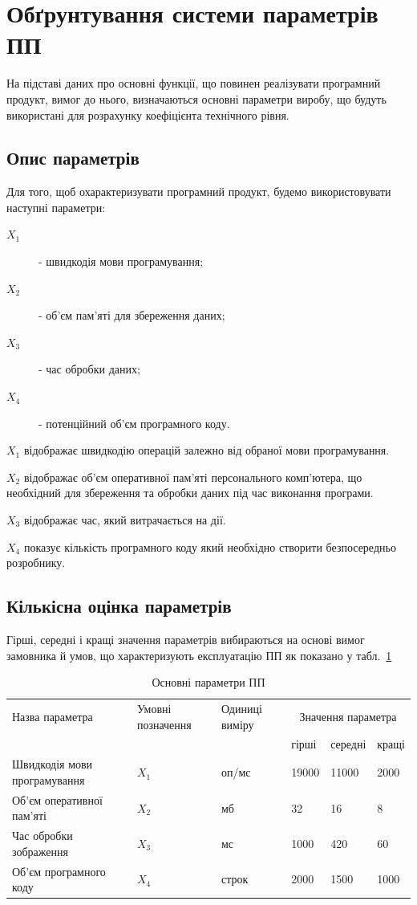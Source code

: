 \section{Обґрунтування системи параметрів ПП}
На підставі даних про основні функції, що повинен реалізувати програмний продукт, вимог до нього, визначаються основні параметри виробу, що будуть використані для розрахунку коефіцієнта технічного рівня.

\subsection{Опис параметрів}

Для того, щоб охарактеризувати програмний продукт, будемо використовувати наступні параметри:
\begin{description}
	\item[$X_1$] - швидкодія мови програмування;
	\item[$X_2$] - об’єм пам’яті для збереження даних;
	\item[$X_3$] - час обробки даних;
	\item[$X_4$] - потенційний об’єм програмного коду.
\end{description}

$X_1$ відображає швидкодію операцій залежно від обраної мови програмування. 

$X_2$ відображає об'єм оперативної пам'яті персонального комп'ютера, що необхідний для збереження та обробки даних під час виконання програми.

$X_3$ відображає час, який витрачається на дії.

$X_4$ показує кількість програмного коду який необхідно створити безпосередньо розробнику. 

\subsection{Кількісна оцінка параметрів}
Гірші, середні і кращі значення параметрів вибираються на основі вимог замовника й умов, що характеризують експлуатацію ПП як показано у табл.~\ref*{tab:economics_program_parameters}

\begin{table}[H]
	\caption{Основні параметри ПП}
	\centering
\begin{tabular}{|p{}|p{}|p{}|p{}|p{}|p{}|}
	\hline
	Назва параметра & Умовні позначення & Одиниці виміру & \multicolumn{3}{c|}{Значення параметра} \\ \cline{4-6}
	& & & гірші & середні & кращі \\
	\hline	
	Швидкодія мови програмування & $X_1$ & оп/мс & 19000 & 11000 & 2000 \\ 
	\hline
	Об'єм оперативної пам'яті & $X_2$ & мб & 32 & 16 & 8 \\
	\hline
	Час обробки зображення & $X_3$ & мс & 1000 & 420 & 60  \\
	\hline
	Об'єм програмного коду & $X_4$ & строк & 2000 &1500& 1000 \\
	\hline
\end{tabular}		
	\label{tab:economics_program_parameters}
\end{table}


